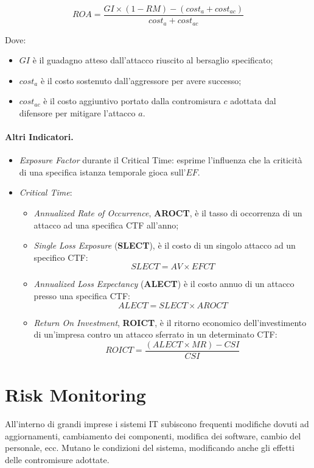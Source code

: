 \[
    ROA = \frac{GI \times (1 - RM) - (cost_a + cost_{ac})}{cost_a + cost_{ac}}
\]

Dove:

\begin{itemize}
    \item \(GI\) è il guadagno atteso dall'attacco riuscito al bersaglio
          specificato;
    \item \(cost_{a}\) è il costo sostenuto dall'aggressore per avere successo;
    \item \(cost_{ac}\) è il costo aggiuntivo portato dalla contromisura \(c\)
          adottata dal difensore per mitigare
          l'attacco \(a\).
\end{itemize}

\paragraph{Altri Indicatori.}

\begin{itemize}
    \item \textit{Exposure Factor} durante il Critical Time:
          esprime l'influenza che la criticità di una specifica
          istanza temporale gioca sull'\(EF\).
    \item \textit{Critical Time}:
          \begin{itemize}
              \item \textit{Annualized Rate of Occurrence}, \textbf{AROCT},
                    è il tasso di occorrenza di un attacco ad
                    una specifica CTF all'anno;
              \item \textit{Single Loss Exposure} (\textbf{SLECT}), è il costo
                    di un singolo attacco ad un specifico CTF:
                    \[
                        SLECT = AV \times EFCT
                    \]
              \item \textit{Annualized Loss Expectancy} (\textbf{ALECT}) è il
                    costo annuo di un attacco presso una
                    specifica CTF:
                    \[
                        ALECT = SLECT \times AROCT
                    \]
              \item \textit{Return On Investment}, \textbf{ROICT}, è il ritorno
                    economico dell'investimento di
                    un'impresa contro un attacco sferrato in un determinato CTF:
                    \[
                        ROICT = \frac{(ALECT \times MR) - CSI}{CSI}
                    \]
          \end{itemize}
\end{itemize}

\section{Risk Monitoring}

All'interno di grandi imprese i sistemi IT subiscono frequenti modifiche dovuti
ad aggiornamenti,
cambiamento dei componenti, modifica dei software, cambio del personale, ecc.
Mutano le condizioni del sistema, modificando anche gli effetti delle
contromisure adottate.